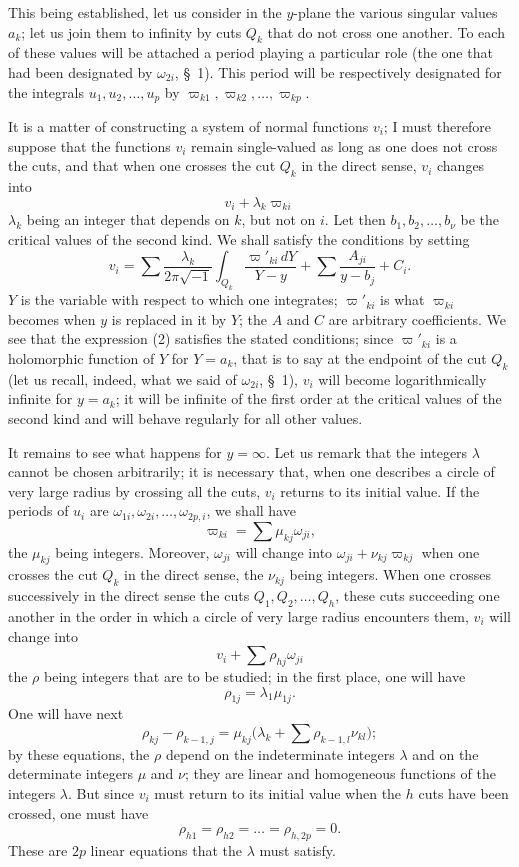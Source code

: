 \documentclass{article}
\begin{document}
This being established, let us consider in the $y$-plane the various singular values $a_{k}$; let us join them to infinity by cuts $Q_{k}$ that do not cross one another. To each of these values will be attached a period playing a particular role (the one that had been designated by $\omega_{2i}$, \S~1). This period will be respectively designated for the integrals $u_{1}, u_{2}, \ldots, u_{p}$ by $\varpi_{k1}, \varpi_{k2}, \ldots, \varpi_{kp}$.

It is a matter of constructing a system of normal functions $v_{i}$; I must therefore suppose that the functions $v_{i}$ remain single-valued as long as one does not cross the cuts, and that when one crosses the cut $Q_{k}$ in the direct sense, $v_{i}$ changes into
\[
v_{i} + \lambda_{k} \varpi_{ki}
\]
$\lambda_{k}$ being an integer that depends on $k$, but not on $i$. Let then $b_{1}, b_{2}, \ldots, b_{\nu}$ be the critical values of the second kind. We shall satisfy the conditions by setting
\[
v_{i} = \sum \frac{\lambda_{k}}{2\pi\sqrt{-1}} \int_{Q_{k}} \frac{\varpi'_{ki}\,dY}{Y - y} + \sum \frac{A_{ji}}{y - b_{j}} + C_{i}. \tag{2}
\]
$Y$ is the variable with respect to which one integrates; $\varpi'_{ki}$ is what $\varpi_{ki}$ becomes when $y$ is replaced in it by $Y$; the $A$ and $C$ are arbitrary coefficients. We see that the expression (2) satisfies the stated conditions; since $\varpi'_{ki}$ is a holomorphic function of $Y$ for $Y = a_{k}$, that is to say at the endpoint of the cut $Q_{k}$ (let us recall, indeed, what we said of $\omega_{2i}$, \S~1), $v_{i}$ will become logarithmically infinite for $y = a_{k}$; it will be infinite of the first order at the critical values of the second kind and will behave regularly for all other values.

It remains to see what happens for $y = \infty$. Let us remark that the integers $\lambda$ cannot be chosen arbitrarily; it is necessary that, when one describes a circle of very large radius by crossing all the cuts, $v_{i}$ returns to its initial value. If the periods of $u_{i}$ are $\omega_{1i}, \omega_{2i}, \ldots, \omega_{2p,i}$, we shall have
\[
\varpi_{ki} = \sum \mu_{kj} \omega_{ji},
\]
the $\mu_{kj}$ being integers. Moreover, $\omega_{ji}$ will change into $\omega_{ji} + \nu_{kj} \varpi_{kj}$ when one crosses the cut $Q_{k}$ in the direct sense, the $\nu_{kj}$ being integers. When one crosses successively in the direct sense the cuts $Q_{1}, Q_{2}, \ldots, Q_{h}$, these
cuts succeeding one another in the order in which a circle of very large radius encounters them, $v_{i}$ will change into
\[
v_{i} + \sum \rho_{hj} \omega_{ji}
\]
the $\rho$ being integers that are to be studied; in the first place, one will have
\[
\rho_{1j} = \lambda_{1} \mu_{1j}.
\]
One will have next
\[
\rho_{kj} - \rho_{k-1, j} = \mu_{kj} \biggl( \lambda_{k} + \sum \rho_{k-1, l} \nu_{kl} \biggr);
\]
by these equations, the $\rho$ depend on the indeterminate integers $\lambda$ and on the determinate integers $\mu$ and $\nu$; they are linear and homogeneous functions of the integers $\lambda$. But since $v_{i}$ must return to its initial value when the $h$ cuts have been crossed, one must have
\[
\rho_{h1} = \rho_{h2} = \ldots = \rho_{h, 2p} = 0. \tag{3}
\]
These are $2p$ linear equations that the $\lambda$ must satisfy.
\end{document}
